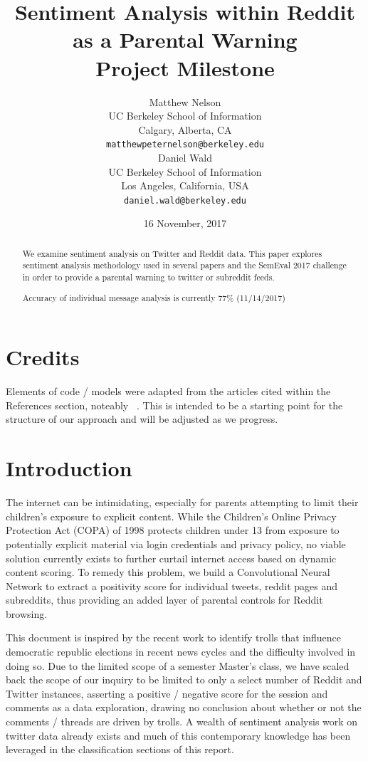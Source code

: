 \documentclass[11pt]{article}
\title{Sentiment Analysis within Reddit as a Parental Warning \\
		Project Milestone}
\author{  Matthew Nelson \\
  UC Berkeley School of Information \\
  Calgary, Alberta, CA \\
  {\tt matthewpeternelson@berkeley.edu} \\\And
  Daniel Wald \\
  UC Berkeley School of Information \\
  Los Angeles, California, USA \\
  {\tt daniel.wald@berkeley.edu} \\
  }
\date{16 November, 2017}
\begin{document}
\maketitle
\begin{abstract}
  We examine sentiment analysis on Twitter
  and Reddit data. This paper explores sentiment analysis
  methodology used in several papers and the SemEval 2017 challenge in
  order to provide a parental warning to twitter or subreddit feeds.
  
  Accuracy of individual message analysis is currently \(77\%\) (11/14/2017)  
  
\end{abstract}

\section{Credits}

Elements of code / models were adapted from the articles cited within the 
References section, noteably ~\cite{agarwol:11}. This is intended to be a 
starting point for the structure of our approach and will be adjusted as we progress.

\section{Introduction}

The internet can be intimidating, especially for parents attempting 
to limit their children's exposure to explicit content. While the 
Children's Online Privacy Protection Act (COPA) of 1998 protects 
children under 13 from exposure to potentially explicit material 
via login credentials and privacy policy, no viable solution 
currently exists to further curtail internet access based on dynamic 
content scoring. To remedy this problem, we build a Convolutional Neural Network to extract 
a positivity score for individual tweets, reddit pages and subreddits, thus 
providing an added layer of parental controls for Reddit browsing.

This document is inspired by the recent work to identify trolls that 
influence democratic republic elections in recent news cycles and the 
difficulty involved in doing so. Due to the limited scope of a 
semester Master's class, we have scaled back the scope of our inquiry 
to be limited to only a select number of Reddit and Twitter instances, asserting 
a positive / negative score for the session and comments as a data exploration, 
drawing no conclusion about whether or not the comments / threads are 
driven by trolls. A wealth of sentiment analysis work on twitter data already 
exists and much of this contemporary knowledge has been leveraged in the 
classification sections of this report.
\end{document}
